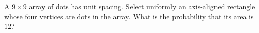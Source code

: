 A $9\times9$ array of dots has unit spacing. Select uniformly an axis-aligned rectangle whose four vertices are dots in the array. What is the probability that its area is $12$?
